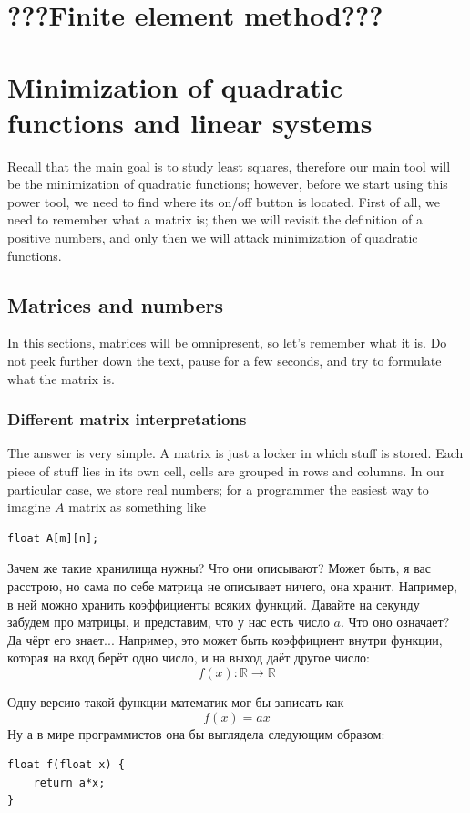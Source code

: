\documentclass[notitlepage]{report}
\begin{document}
\chapter{???Finite element method???}

\chapter{Minimization of quadratic functions and linear systems}

Recall that the main goal is to study least squares, therefore our main tool will be the minimization of quadratic functions;
however, before we start using this power tool, we need to find where its on/off button is located.
First of all, we need to remember what a matrix is; then we will revisit the definition of a positive numbers, and only then we will attack minimization of quadratic functions.

\section{Matrices and numbers}
In this sections, matrices will be omnipresent, so let's remember what it is.
Do not peek further down the text, pause for a few seconds, and try to formulate what the matrix is.

\subsection{Different matrix interpretations}

The answer is very simple. A matrix is just a locker in which stuff is stored.
Each piece of stuff lies in its own cell, cells are grouped in rows and columns.
In our particular case, we store real numbers; for a programmer the easiest way to imagine $A$ matrix as something like
\begin{verbatim}
float A[m][n];
\end{verbatim}

Зачем же такие хранилища нужны? Что они описывают? Может быть, я вас расстрою, но сама по себе матрица не описывает ничего, она хранит. Например, в ней можно хранить коэффициенты всяких функций.
Давайте на секунду забудем про матрицы, и представим, что у нас есть число $a$. Что оно означает?
Да чёрт его знает... Например, это может быть коэффициент внутри функции, которая на вход берёт одно число, и на выход даёт другое число:
$$
f(x) : \mathbb R \rightarrow \mathbb R
$$

Одну версию такой функции математик мог бы записать как 
$$
f(x) = ax
$$
Ну а в мире программистов она бы выглядела следующим образом:
\begin{verbatim}
float f(float x) {
    return a*x;
}
\end{verbatim}
\end{document}
